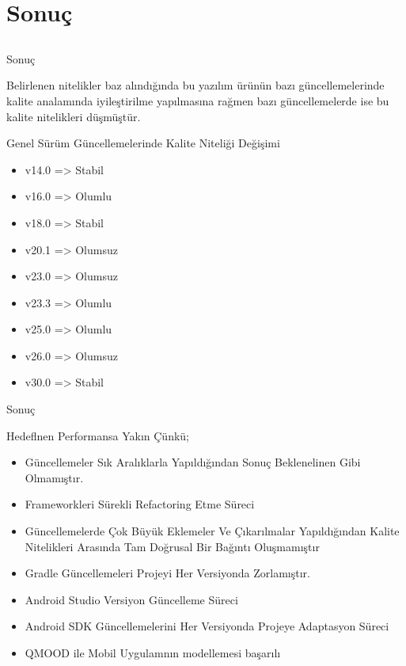 \documentclass[compress,xcolor=table]{beamer}
\begin{document}
\section{Sonuç} \subsection{}
 \begin{frame}{Sonuç}
 
 Belirlenen nitelikler baz alındığında bu yazılım ürünün bazı güncellemelerinde kalite analamında iyileştirilme yapılmasına rağmen bazı güncellemelerde ise bu kalite nitelikleri düşmüştür.
 
 
\begin{block}{Genel Sürüm Güncellemelerinde Kalite Niteliği Değişimi }
		
\begin{itemize}
\item v14.0 => Stabil
\item v16.0 => Olumlu
\item v18.0 => Stabil
\item v20.1 => Olumsuz
\item v23.0 => Olumsuz
\item v23.3 => Olumlu
\item v25.0 => Olumlu
\item v26.0 => Olumsuz
\item v30.0 => Stabil



\end{itemize}

		
\end{block}
\end{frame}

 \begin{frame}{Sonuç}
\begin{block}{Hedeflnen Performansa Yakın Çünkü; }
		
\begin{itemize}
\item Güncellemeler Sık Aralıklarla Yapıldığından Sonuç Beklenelinen Gibi Olmamıştır.
\item Frameworkleri Sürekli Refactoring Etme Süreci
\item Güncellemelerde Çok Büyük Eklemeler Ve Çıkarılmalar Yapıldığından Kalite Nitelikleri Arasında Tam Doğrusal Bir Bağıntı Oluşmamıştır
\item Gradle Güncellemeleri Projeyi Her Versiyonda Zorlamıştır.
\item Android Studio Versiyon Güncelleme Süreci 
\item Android SDK Güncellemelerini Her Versiyonda Projeye Adaptasyon Süreci
\item QMOOD ile Mobil Uygulamnın modellemesi başarılı



\end{itemize}

		
\end{block}
\end{frame}
\end{document}
